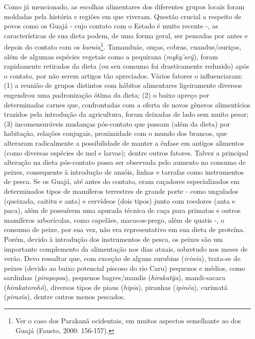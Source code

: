 Como já mencionado, as escolhas alimentares dos diferentes grupos locais
foram moldadas pela história e regiões em que viveram. Questão crucial a
respeito de povos como os Guajá - cujo contato com o Estado é muito
recente -, as características de sua dieta podem, de uma forma geral,
ser pensadas por antes e depois do contato com os
\emph{karaia}\footnote{Ver o caso dos Parakanã ocidentais, em muitos
  aspectos semelhante ao dos Guajá (Fausto, 2000: 156-157).}. Tamanduás,
onças, cobras, cuandus/ouriços, além de algumas espécies vegetais como a
pequirana (\emph{myky'arỹ}), foram rapidamente retirados da dieta (ou
seu consumo foi drasticamente reduzido) após o contato, por não serem
artigos tão apreciados. Vários fatores o influenciaram: (1) a reunião de
grupos distintos com hábitos alimentares ligeiramente diversos engendrou
uma padronização ótima da dieta; (2) o baixo apreço por determinadas
carnes que, confrontadas com a oferta de novos gêneros alimentícios
trazidos pela introdução da agricultura, foram deixadas de lado sem
muito pesar; (3) incomensuráveis mudanças pós-contato que passam (além
da dieta) por habitação, relações conjugais, proximidade com o mundo dos
brancos, que alteraram radicalmente a possibilidade de manter a ênfase
em antigos alimentos (como diversas espécies de mel e larvas); dentre
outros fatores. Talvez a principal alteração na dieta pós-contato possa
ser observada pelo aumento no consumo de peixes, consequente à
introdução de anzóis, linhas e tarrafas como instrumentos de pesca. Se
os Guajá, até antes do contato, eram caçadores especializados em
determinados tipos de mamíferos terrestres de grande porte - como
ungulados (queixada, caititu e anta) e cervídeos (dois tipos) junto com
roedores (anta e paca), além de possuírem uma apurada técnica de caça
para primatas e outros mamíferos arborícolas, como capelães,
macacos-prego, além de quatis -, o consumo de peixe, por sua vez, não
era representativo em sua dieta de proteína. Porém, devido à introdução
dos instrumentos de pesca, os peixes são um importante complemento da
alimentação nos dias atuais, sobretudo nos meses de verão. Devo
ressaltar que, com exceção de alguns surubins (\emph{iriwia}), trata-se
de peixes (devido ao baixo potencial piscoso do rio Caru) pequenos e
médios, como sardinhas (\emph{pirapopoa}), pequenos bagres/mandis
(\emph{hirakatỹa}), mandi-sacaca (\emph{hirakatorohõ}), diversos tipos
de piaus (\emph{hipia}), piranhas (\emph{ipinẽa}), curimatá
(\emph{piraxĩa}), dentre outros menos pescados.

